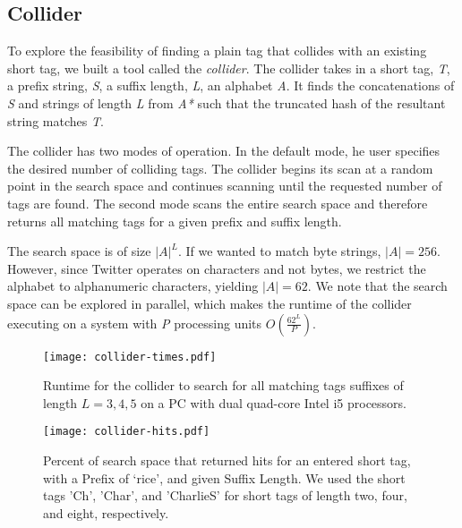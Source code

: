 \subsection{Collider}
\label{sec:collider}

To explore the feasibility of finding a plain tag that collides with an
existing short tag, we built a tool called the {\em collider}.
The collider takes in a short tag, \textit{T}, a prefix string,
\textit{S}, a suffix length, \textit{L}, an alphabet \textit{A}. It
finds the concatenations of \textit{S} and strings of length \textit{L}
from \textit{A*} such that the truncated hash of the resultant string
matches \textit{T}.

The collider has two modes of operation. In the default mode, he user
specifies the desired number of colliding tags. The collider begins its
scan at a random point in the search space and continues scanning until
the requested number of tags are found. The second mode scans the entire
search space and therefore returns all matching tags for a given prefix
and suffix length.

The search space is of size $|A|^L$. If we wanted to match byte strings,
$|A| = 256$. However, since Twitter operates on characters and not
bytes, we restrict the alphabet to alphanumeric characters, yielding
$|A| = 62$. We note that the search space can be explored in parallel,
which makes the runtime of the collider executing on a system with
\textit{P} processing units $O(\frac{62^L}{P})$.

\begin{figure}
\begin{center}
\texttt{[image: collider-times.pdf]}
\caption{Runtime for the collider to search for all matching tags
  suffixes of length $L=3,4,5$ on a PC with dual quad-core Intel i5
  processors.
\label{fig:collider-times}
}
\end{center}
\end{figure}

\begin{figure}
\begin{center}
\texttt{[image: collider-hits.pdf]}
\caption{Percent of search space that returned hits for an entered short
  tag, with a Prefix of `rice', and given Suffix Length. We used the
  short tags 'Ch', 'Char', and 'CharlieS' for short tags of length two,
  four, and eight, respectively.
\label{fig:collider-hits}
}
\end{center}
\end{figure}

